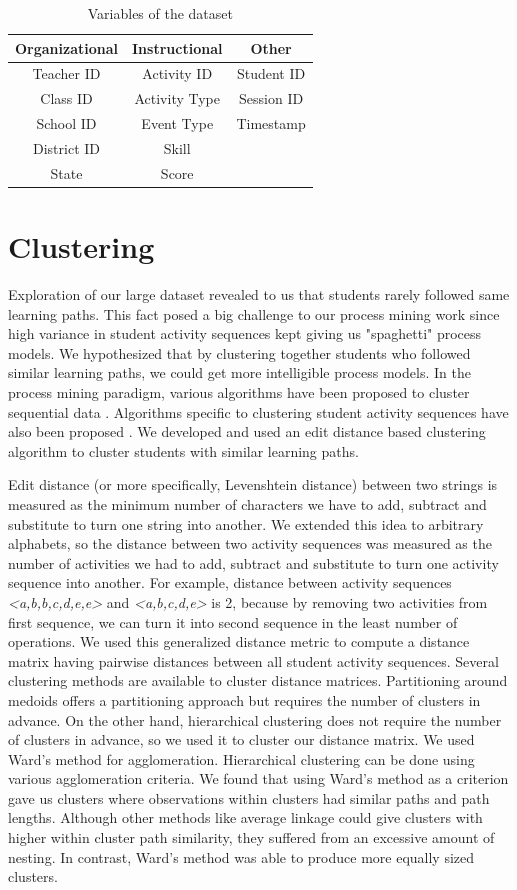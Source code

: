 \documentclass{edm_template}
\begin{document}
\begin{table}
\centering
\caption{Variables of the dataset}
\begin{tabular}{ c c c } \hline
Organizational & Instructional & Other \\ \hline
Teacher ID  & Activity ID & Student ID \\
Class ID & Activity Type & Session ID \\
School ID & Event Type & Timestamp \\
District ID & Skill & \\
State & Score & \\
\hline\end{tabular}
\end{table}

\section{Clustering}
Exploration of our large dataset revealed to us that students rarely followed same learning paths. This fact posed a big challenge to our process mining work since high variance in student activity sequences kept giving us "spaghetti" process models. We hypothesized that by clustering together students who followed similar learning paths, we could get more intelligible process models. In the process mining paradigm, various algorithms have been proposed to cluster sequential data \cite{bose2009context}. Algorithms specific to clustering student activity sequences have also been proposed \cite{klingler2016temporally}. We developed and used an edit distance based clustering algorithm to cluster students with similar learning paths.

Edit distance (or more specifically, Levenshtein distance) between two strings is measured as the minimum number of characters we have to add, subtract and substitute to turn one string into another. We extended this idea to arbitrary alphabets, so the distance between two activity sequences was measured as the number of activities we had to add, subtract and substitute to turn one activity sequence into another. For example, distance between activity sequences \textit{<a,b,b,c,d,e,e>} and \textit{<a,b,c,d,e>} is 2, because by removing two activities from first sequence, we can turn it into second sequence in the least number of operations. We used this generalized distance metric to compute a distance matrix having pairwise distances between all student activity sequences. Several clustering methods are available to cluster distance matrices. Partitioning around medoids offers a partitioning approach but requires the number of clusters in advance. On the other hand, hierarchical clustering does not require the number of clusters in advance, so we used it to cluster our distance matrix. We used Ward's method for agglomeration. Hierarchical clustering can be done using various agglomeration criteria. We found that using Ward's method as a criterion gave us clusters where observations within clusters had similar paths and path lengths. Although other methods like average linkage could give clusters with higher within cluster path similarity, they suffered from an excessive amount of nesting. In contrast, Ward's method was able to produce more equally sized clusters.
\end{document}
